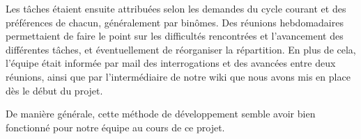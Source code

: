 Les tâches étaient ensuite attribuées selon les demandes du cycle courant et des préférences de chacun, généralement par binômes. Des réunions hebdomadaires permettaient de faire le point sur les difficultés rencontrées et l'avancement des différentes tâches, et éventuellement de réorganiser la répartition. En plus de cela, l'équipe était informée par mail des interrogations et des avancées entre deux réunions, ainsi que par l'intermédiaire de notre wiki que nous avons mis en place dès le début du projet.

De manière générale, cette méthode de développement semble avoir bien fonctionné pour notre équipe au cours de ce projet.
